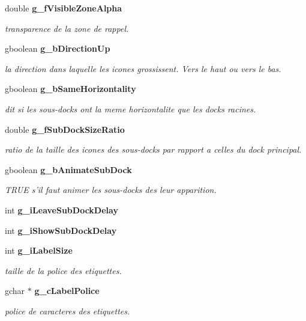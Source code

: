 \begin{CompactItemize}
double {\bf g\_\-f\-Visible\-Zone\-Alpha}
\begin{CompactList}\small\item\em transparence de la zone de rappel. \item\end{CompactList}\item 
gboolean {\bf g\_\-b\-Direction\-Up}
\begin{CompactList}\small\item\em la direction dans laquelle les icones grossissent. Vers le haut ou vers le bas. \item\end{CompactList}\item 
gboolean {\bf g\_\-b\-Same\-Horizontality}
\begin{CompactList}\small\item\em dit si les sous-docks ont la meme horizontalite que les docks racines. \item\end{CompactList}\item 
double {\bf g\_\-f\-Sub\-Dock\-Size\-Ratio}
\begin{CompactList}\small\item\em ratio de la taille des icones des sous-docks par rapport a celles du dock principal. \item\end{CompactList}\item 
gboolean {\bf g\_\-b\-Animate\-Sub\-Dock}
\begin{CompactList}\small\item\em TRUE s'il faut animer les sous-docks des leur apparition. \item\end{CompactList}\item 
int {\bf g\_\-i\-Leave\-Sub\-Dock\-Delay}
\item 
int {\bf g\_\-i\-Show\-Sub\-Dock\-Delay}
\item 
int {\bf g\_\-i\-Label\-Size}
\begin{CompactList}\small\item\em taille de la police des etiquettes. \item\end{CompactList}\item 
gchar $\ast$ {\bf g\_\-c\-Label\-Police}
\begin{CompactList}\small\item\em police de caracteres des etiquettes. \item\end{CompactList}\item 

\end{CompactItemize}
